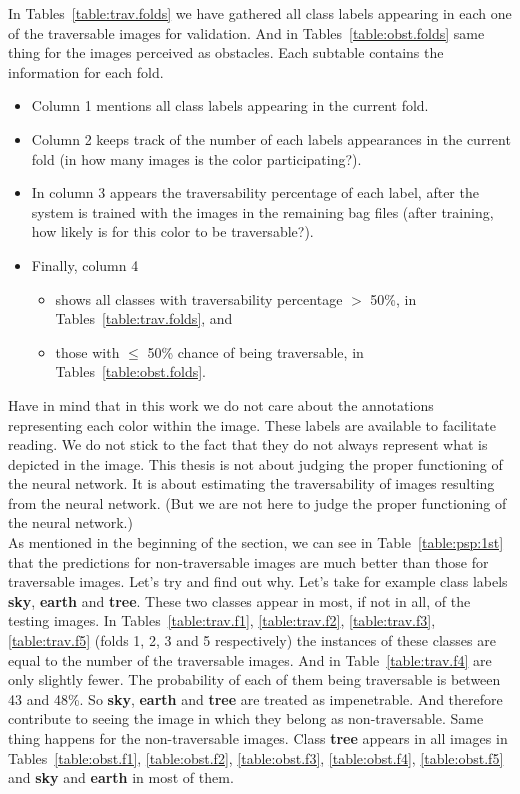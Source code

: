 \documentclass[12pt,a4paper,table,dvipsnames,tikz]{report}
\newcommand{\bl}[1]{{\hypersetup{linkcolor=blue}#1}}
\newcommand{\class}[1]{\textbf{\textcolor{#1}{#1}}} %
\begin{document}
	In Tables~\bl{\ref{table:trav.folds}} we have gathered all class labels appearing in each 
	one of the traversable images for validation. And in Tables~\bl{\ref{table:obst.folds}} 
	same thing for the images perceived as obstacles. Each subtable contains the information 
	for each fold. 
	\begin{itemize}
		\item Column 1 mentions all class labels appearing in the current fold.
		\item Column 2 keeps track of the number of each labels appearances in the current fold 
		(in how many images is the color participating?).
		\item In column 3 appears the traversability percentage of each label, after the system 
		is trained with the images in the remaining bag files (after training, how likely is for 
		this color to be traversable?).
		\item Finally, column 4 
		\begin{itemize}
			\item shows all classes with traversability percentage $>$ 50\%, in 
			Tables~\bl{\ref{table:trav.folds}}, and
			\item those with $\le$ 50\% chance of being traversable, in 
			Tables~\bl{\ref{table:obst.folds}}.
		\end{itemize}
	\end{itemize}
	
	Have in mind that in this work we do not care about the annotations representing each 
	color within the image. These labels are available to facilitate reading. We do not 
	stick to the fact that they do not always represent what is depicted in the image. This 
	thesis is not about judging the proper functioning of the neural network. It is about 
	estimating the traversability of images resulting from the neural network. (But we are not here to judge the proper functioning of the neural network.)
	\\
	
	As mentioned in the beginning of the section, we can see in Table~\bl{\ref{table:psp:1st}} 
	that the predictions for non-traversable images are much better than those for 
	traversable images. Let's try and find out why. Let's take for example class labels 
	\class{sky}, \class{earth} and \class{tree}. These two classes appear in most, if not in 
	all, of the testing images. In Tables~\bl{\ref{table:trav.f1}, \ref{table:trav.f2}, 
	\ref{table:trav.f3}, \ref{table:trav.f5}} (folds 1, 2, 3 and 5 respectively) the instances 
	of these classes are equal to the number of the traversable images. And in 
	Table~\bl{\ref{table:trav.f4}} are only slightly fewer. The probability of each of them 
	being traversable is between 43 and 48\%. So \class{sky}, \class{earth} and \class{tree} 
	are treated as impenetrable. And therefore contribute to seeing the image in which they 
	belong as non-traversable. Same thing happens for the non-traversable images. Class 
	\class{tree} appears in all images in Tables~\bl{\ref{table:obst.f1}, \ref{table:obst.f2}, 
	\ref{table:obst.f3}, \ref{table:obst.f4}, \ref{table:obst.f5}} and \class{sky} and 
	\class{earth} in most of them.
	\\
	
\end{document}
